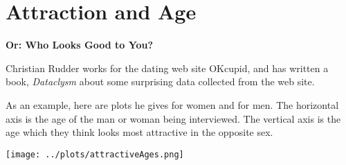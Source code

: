 \def\theTopic{Correlation/Slope }
\def\dayNum{17 }


\section{Attraction and Age}

\begin{center}
{\bf {Or: Who Looks Good to You?}}
\end{center}


Christian Rudder works for the dating web site OKcupid, and has
written a book, {\it Dataclysm} about some surprising data 
collected from the web site.

As an example, here are plots he gives for women and for men.
The horizontal axis is the age of the man or woman being
interviewed. The vertical axis is the age which they think looks most
attractive in the opposite sex.\vspace{-.5cm}

\texttt{[image: ../plots/attractiveAges.png]}


